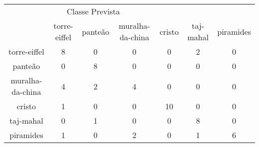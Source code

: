 \begin{tabular}{|c|c|c|c|c|c|c|}
\hline
\multicolumn{5}{|c|}{Classe Prevista}\\
 & torre-eiffel & panteão & muralha-da-china & cristo & taj-mahal & piramides\\
torre-eiffel & 8 & 0 & 0 & 0 & 2 & 0\\
panteão & 0 & 8 & 0 & 0 & 0 & 0\\
muralha-da-china & 4 & 2 & 4 & 0 & 0 & 0\\
cristo & 1 & 0 & 0 & 10 & 0 & 0\\
taj-mahal & 0 & 1 & 0 & 0 & 8 & 0\\
piramides & 1 & 0 & 2 & 0 & 1 & 6\\
\end{tabular}

